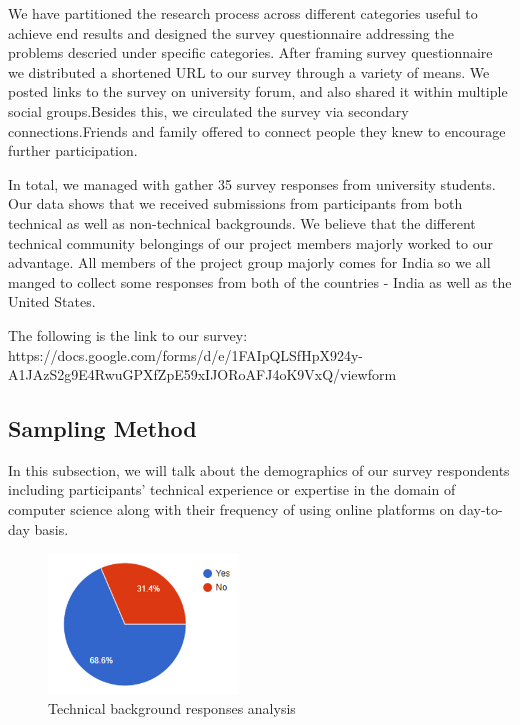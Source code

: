 \documentclass[conference]{IEEEtran}
\begin{document}
We have partitioned the research process across different categories useful to achieve end results and designed the survey questionnaire addressing the problems descried under specific categories. After framing survey questionnaire we distributed a shortened URL to our survey through a variety of means. We posted links to the survey on university forum, and also shared it within multiple social groups.Besides this, we circulated the survey via secondary connections.Friends and family offered to connect people they knew to encourage further participation.

In total, we managed with gather 35 survey responses from university students. Our data shows that we received submissions from participants from both technical as well as non-technical backgrounds. We believe that the different technical community belongings of our project members majorly worked to our advantage. All members of the project group majorly comes for India so we all manged to collect some responses from both of the countries - India as well as the United States.  

The following is the link to our survey: https://docs.google.com/forms/d/e/1FAIpQLSfHpX924y-A1JAzS2g9E4RwuGPXfZpE59xIJORoAFJ4oK9VxQ/viewform 

\subsection{Sampling Method}

In this subsection, we will talk about the demographics of
our survey respondents including participants' technical experience or expertise in the domain of computer science along with their frequency of using online platforms on day-to-day basis.

\begin{figure}[htbp]
\centerline{\includegraphics[width=0.45\textwidth]{Technical_Expertised Entries.PNG}}
\caption{Technical background responses analysis}
\label{fig}
\end{figure}
\end{document}
